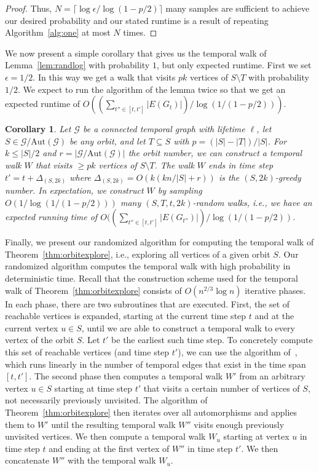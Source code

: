 \documentclass[10pt,a4paper]{article}
\newtheorem{corollary}{Corollary}[section]
\newcommand{\auttg}{\ensuremath{\text{Aut}(\mathcal{G})}}
\newcommand{\torb}{\ensuremath{\mathcal{G}/\auttg}}
\begin{document}
{{\begin{proof}
    Thus, {$N = \lceil \log \epsilon/\log(1-p/2) \rceil$} many
    samples are sufficient to achieve our desired probability and our stated
    runtime is a result of repeating Algorithm~\ref{alg:one} at most $N$ times.
\end{proof}
}
{We now present a simple corollary that gives us the temporal walk
    of Lemma~\ref{lem:randlog} with probability $1$, but only expected runtime.
    First we set $\epsilon=1/2$. In this way we get a walk
    that visits $pk$ vertices of $S\setminus T$ with probability $1/2$. 
    We expect to run the algorithm of the lemma twice so that
    we get an
    expected runtime of $O((\sum_{t'' \in [t, t']} |E(G_t)|)/ \log(1/(1-p/2)))$.

\begin{corollary}\label{cor:expfraction}
    Let $\mathcal{G}$ be a connected temporal graph with lifetime $\ell$, let
    $S \in \torb$ be any orbit, and let $T \subseteq S$ with $p=(|S|-|T|)/|S|$.
    For $k \leq |S|/2$ and $r=|\torb|$ the orbit number, we can construct a
    temporal walk $W$ that visits $\geq p k$ vertices of $S \setminus T$. The
    walk $W$ ends in time step $t'=t+\Delta_{(S, 2k)}$ where $\Delta_{(S,
    2k)}=O(k(k n/|S|+r))$ is the $(S, 2k)$-greedy number. 
%
    {In expectation, we construct $W$ by 
    sampling $O(1/\log(1/(1-p/2)))$ many $(S, T, t, 2k)$-random walks, i.e.,
    we have}
    an expected running time of $O((\sum_{t'' \in [t, t']}|E(G_{t''})|)
    /\log(1/(1-p/2))$.
\end{corollary}
}

Finally, we present our randomized algorithm for computing the temporal walk of
Theorem~\ref{thm:orbitexplore}, i.e., exploring all vertices of a given orbit
$S$. Our randomized algorithm computes the temporal walk with high probability
in deterministic time. Recall that the construction scheme used
for the temporal walk of Theorem~\ref{thm:orbitexplore} consists of
$O(n^{2/3}\log n)$ iterative phases. In each phase, there are two subroutines
that are executed. First, the set of reachable vertices is expanded, starting at
the current time step $t$ and at the current vertex $u \in S$, until we are able
to construct a temporal walk to {every vertex} of the orbit $S$. Let $t'$ be the
earliest such time step. To concretely compute this set of reachable vertices
(and time step $t'$), we can use the algorithm of~\cite{WuCYSYW16}, which runs
linearly in the number of temporal edges that exist in the time span $[t, t']$.
The second phase then computes a temporal walk $W'$ from an arbitrary vertex $u
\in S$ starting at time step $t'$ that visits a certain number of vertices of
$S$, not necessarily previously unvisited. {The algorithm of Theorem~\ref{thm:orbitexplore} then
iterates} over all
automorphisms and {applies} them to $W'$ until the resulting temporal walk $W''$
visits enough previously unvisited vertices. We then compute a temporal walk
$W_u$ starting at vertex $u$ in time step $t$ and ending at the first vertex of
$W''$ in time step $t'$. We then concatenate $W''$ with the temporal walk $W_u$.

}
\end{document}

